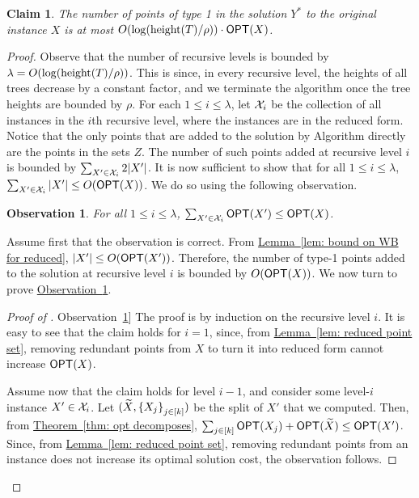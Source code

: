 \documentclass[11pt]{article}
\numberwithin{equation}{section}
\newtheorem{claim}[theorem]{Claim}
\theoremstyle{definition}
\theoremstyle{plain}
\newcommand{\expref}[2]{\hyperref[#2]{#1~\ref{#2}}}
\newtheorem{myobs}[theorem]{Observation}
\begin{document}
\begin{claim}\label{claim: type 1 points}
	The number of points of type 1 in the solution $Y^*$ to the original instance $X$ is at most $O(\log(\operatorname{height}(T)/\rho))\cdot \mbox{\sf OPT}(X)$.
	\end{claim}

\begin{proof}
	Observe that the number of recursive levels is bounded by $\lambda =O(\log(\operatorname{height}(T)/\rho))$. 
	This is since, in every recursive level, the heights of all trees decrease by a constant factor, and we terminate the algorithm once the tree heights are bounded by $\rho$.
	 For each $1\leq i\leq \lambda$, let ${\mathcal{X}}_i$ be the collection of all instances in the $i$th recursive level, where the instances are in the reduced form. Notice that the only points that are added to the solution by Algorithm \recBST directly are the points in the sets $Z$. The number of such points added at recursive level $i$ is bounded by $\sum_{X'\in {\mathcal{X}}_i}2|X'|$. It is now sufficient to show that for all $1\leq i\leq \lambda$, $\sum_{X'\in {\mathcal{X}}_i}|X'|\leq O(\mbox{\sf OPT}(X))$. We do so using the following observation.
	
	\begin{myobs}\label{obs: type 1 points}
		For all $1\leq i\leq \lambda$, $\sum_{X'\in {\mathcal{X}}_i}\mbox{\sf OPT}(X')\leq \mbox{\sf OPT}(X)$.
		\end{myobs}
	
	Assume first that the observation is correct. From \expref{Lemma}{lem: bound on WB for reduced}, $|X'|\leq O(\mbox{\sf OPT}(X'))$. Therefore, the number of type-1 points added to  the solution at recursive level $i$ is bounded by $O(\mbox{\sf OPT}(X))$.
We now turn to prove \expref{Observation}{obs: type 1 points}.
\begin{proof}[Proof of \expref{Observation}{obs: type 1 points}]
	The proof is by induction on the recursive level $i$. It is easy to see that the claim holds for $i=1$, since, from \expref{Lemma}{lem: reduced point set}, removing redundant points from $X$ to turn it into reduced form cannot increase $\mbox{\sf OPT}(X)$.
	
	Assume now that the claim holds for level $i-1$, and consider some level-$i$ instance $X'\in {\mathcal{X}}_i$. Let $(\widetilde{X},\left\{ X_j \right\}_{j \in [k]})$ be the split of  $X'$ that we computed. Then, from  \expref{Theorem}{thm: opt decomposes}, $\sum_{j \in [k]}\mbox{\sf OPT}(X_j) + \mbox{\sf OPT}(\widetilde{X}) \leq \mbox{\sf OPT}(X')$. Since, from \expref{Lemma}{lem: reduced point set}, removing redundant points from an instance does not increase its optimal solution cost, the observation follows.
\end{proof}		 
\end{proof}
\end{document}
